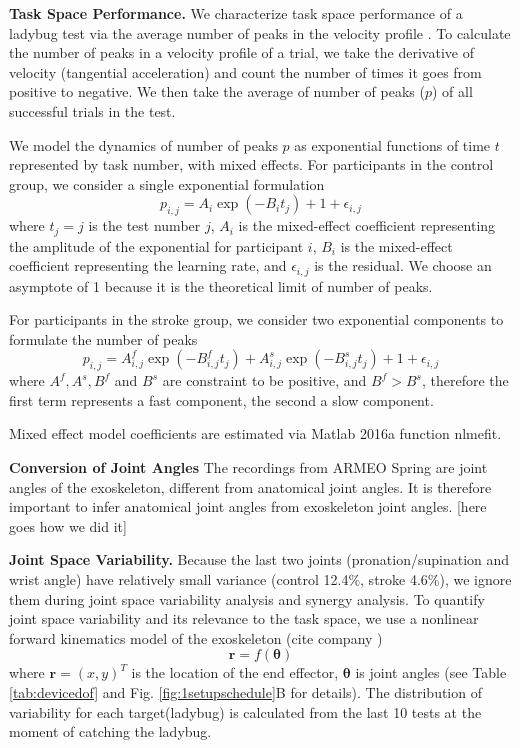 \textbf{Task Space Performance.}
We characterize task space performance of a ladybug test via the average number of peaks in the velocity profile \cite{}. 
To calculate the number of peaks in a velocity profile of a trial, we take the derivative of velocity (tangential acceleration) and count the number of times it goes from positive to negative.
We then take the average of number of peaks ($ p $) of all successful trials in the test.

We model the dynamics of number of peaks $ p $ as exponential functions of time $ t $ represented by task number, with mixed effects.
For participants in the control group, we consider a single exponential formulation
\begin{equation}\label{eqn:singleexp}
p_{i,j} = A_i \exp(-B_i t_{j}) + 1 + \epsilon_{i,j}
\end{equation}
where $ t_{j} = j $ is the test number $ j $, 
$ A_i $ is the mixed-effect coefficient representing the amplitude of the exponential for participant $ i $,
$ B_i $ is the mixed-effect coefficient representing the learning rate,
and $ \epsilon_{i,j} $ is the residual. 
We choose an asymptote of 1 because it is the theoretical limit of number of peaks.

For participants in the stroke group, we consider two exponential components to formulate the number of peaks
\begin{equation}\label{eqn:doubleexp}
p_{i,j} = A^f_{i,j} \exp(-B^f_{i,j} t_j) + A^s_{i,j} \exp(-B^s_{i,j} t_j) + 1 + \epsilon_{i,j}
\end{equation}
where $ A^f, A^s, B^f $ and $ B^s $ are constraint to be positive, and $ B^f > B^s $, therefore the first term represents a fast component, the second a slow component.

Mixed effect model coefficients are estimated via Matlab 2016a function \textsf{nlmefit}.

\textbf{Conversion of Joint Angles}
The recordings from ARMEO Spring are joint angles of the exoskeleton, different from anatomical joint angles.
It is therefore important to infer anatomical joint angles from exoskeleton joint angles. 
[here goes how we did it]

\textbf{Joint Space Variability.}
Because the last two joints (pronation/supination and wrist angle) have relatively small variance (control 12.4\%, stroke 4.6\%), we ignore them during joint space variability analysis and synergy analysis.
To quantify joint space variability and its relevance to the task space, we use a nonlinear forward kinematics model of the exoskeleton (cite company \cite{})
	\begin{equation}\label{eqn:nonlinearForwardKinematics}
	\bm{r} = f(\bm{\theta})
	\end{equation}
where $ \bm{r} = (x,y)^T $ is the location of the end effector, $ \bm{\theta} $ is joint angles (see Table \ref{tab:devicedof} and Fig. \ref{fig:1setupschedule}B for details). 
The distribution of variability for each target(ladybug) is calculated from the last 10 tests at the moment of catching the ladybug. 

